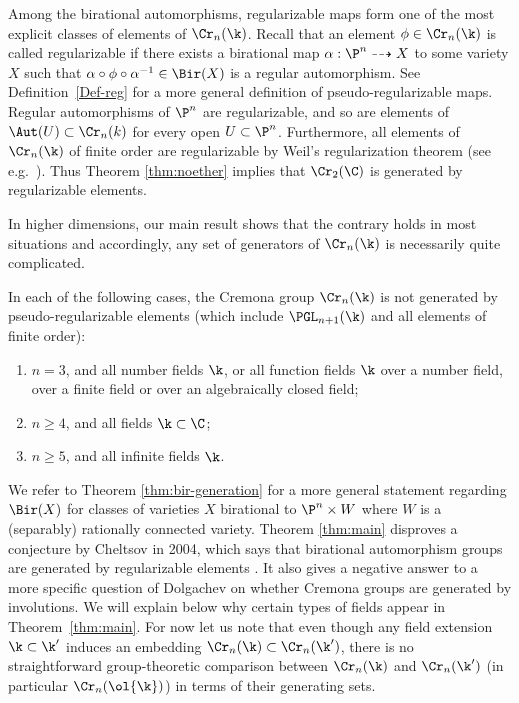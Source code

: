 Among the birational automorphisms,
regularizable maps form
one of the most explicit classes
of elements of $\Cr_n(\k)$.
Recall that an element $\phi \in \Cr_n(\k)$
is called regularizable
if there exists a birational map
$\alpha: \P^n \dashrightarrow X$
to some variety $X$
such that $\alpha \circ \phi \circ \alpha^{-1} \in \Bir(X)$ is a regular automorphism.
See Definition~\ref{Def-reg} for
a more general definition of
pseudo-regularizable maps.
Regular automorphisms of $\P^n$ are regularizable,
and so are elements of $\Aut(U) \subset \Cr_n(k)$
for every open $U \subset \P^n$.
Furthermore, all
elements of $\Cr_n(\k)$ of
finite order are regularizable
by Weil's regularization theorem (see e.g.~\cite[Theorem 1.7]{CheltsovCremona}).
Thus Theorem \ref{thm:noether} implies that $\Cr_2(\C)$
is generated by regularizable elements.


In higher dimensions, our main result shows that
the contrary holds in most situations and accordingly,
any set of generators
of $\Cr_n(\k)$
is necessarily quite complicated.




\begin{theorem}
\notready\label{thm:main}
In each of
the following cases,
the Cremona group
$\Cr_n(\k)$ is not generated by pseudo-regularizable elements
\textup(which include $\PGL_{n+1}(\k)$
and all
elements of finite order\textup):
\begin{enumerate}
    \item $n = 3$, and all number fields $\k$, or all function fields $\k$
    over a number field, over a finite field or over an algebraically closed field;
    \item $n \ge 4$, and all fields $\k \subset \C$;
    \item $n \ge 5$, and all infinite fields $\k$.
\end{enumerate}
\end{theorem}



We refer to Theorem \ref{thm:bir-generation} for a more general statement regarding $\Bir(X)$
for classes of varieties $X$ birational to
$\P^n \times W$ where $W$ is a (separably)
rationally connected variety.
Theorem \ref{thm:main}
disproves a conjecture by Cheltsov in 2004,
which says that
birational automorphism groups are generated by regularizable
elements \cite[Conjecture 1.12]{CheltsovCremona}.
It also
gives a negative answer to
a more specific
question of Dolgachev \cite[Question on p.1]{Deserti} on whether Cremona groups
are generated by involutions.
We will explain below why certain
types of fields appear in Theorem~\ref{thm:main}.
For now let us note that even though
any field extension $\k \subset \k'$
induces
an embedding $\Cr_n(\k) \subset \Cr_n(\k')$,
there is no straightforward group-theoretic comparison
between $\Cr_n(\k)$ and
$\Cr_n(\k')$ (in particular $\Cr_n(\ol{\k})$) in
terms of their generating sets.


